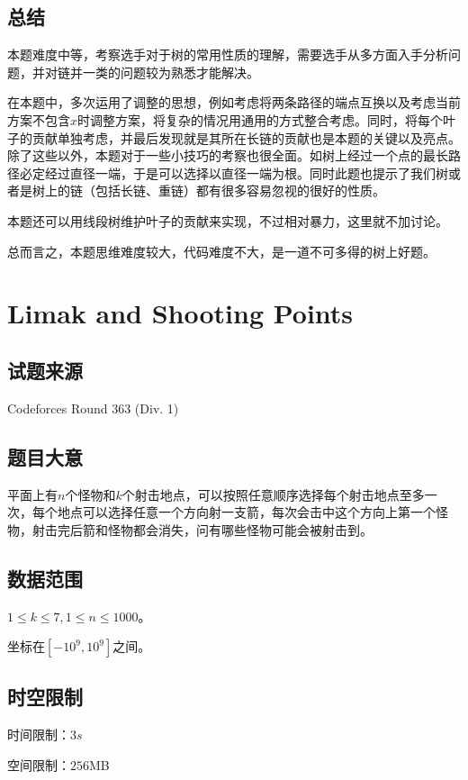 \documentclass[12pt]{article}
\begin{document}
\subsection{总结}
本题难度中等，考察选手对于树的常用性质的理解，需要选手从多方面入手分析问题，并对链并一类的问题较为熟悉才能解决。

在本题中，多次运用了调整的思想，例如考虑将两条路径的端点互换以及考虑当前方案不包含$x$时调整方案，将复杂的情况用通用的方式整合考虑。同时，将每个叶子的贡献单独考虑，并最后发现就是其所在长链的贡献也是本题的关键以及亮点。除了这些以外，本题对于一些小技巧的考察也很全面。如树上经过一个点的最长路径必定经过直径一端，于是可以选择以直径一端为根。同时此题也提示了我们树或者是树上的链（包括长链、重链）都有很多容易忽视的很好的性质。

本题还可以用线段树维护叶子的贡献来实现，不过相对暴力，这里就不加讨论。

总而言之，本题思维难度较大，代码难度不大，是一道不可多得的树上好题。

\newpage

\section{Limak and Shooting Points}

\subsection{试题来源}
Codeforces Round 363 (Div. 1)

\subsection{题目大意}

平面上有$n$个怪物和$k$个射击地点，可以按照任意顺序选择每个射击地点至多一次，每个地点可以选择任意一个方向射一支箭，每次会击中这个方向上$\textbf{第一个}$怪物，射击完后箭和怪物都会消失，问有哪些怪物可能会被射击到。

\subsection{数据范围}
$1\le k\le 7,1\le n\le 1000$。

坐标在$[-10^9,10^9]$之间。

\subsection{时空限制}
时间限制：$3s$

空间限制：$256$MB
\end{document}
